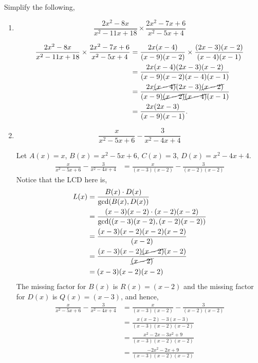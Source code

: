 \documentclass[12pt]{article} %
\begin{document}
\begin{qstn}
  Simplify the following,
  \begin{enumerate}[label=(\alph*)]
    \item \[
        \frac{2x^2 - 8x}{x^2 - 11x + 18} \times \frac{2x^{2} - 7x + 6}{x^2 - 5x + 4}
    \] 

    \begin{solution}
      \begin{align*}
        \frac{2x^2 - 8x}{x^2 - 11x + 18} \times \frac{2x^{2} - 7x + 6}{x^2 - 5x + 4}
        &= \frac{2x(x - 4)}{(x-9)(x-2)} \times \frac{(2x - 3)(x - 2)}{(x-4)(x-1)}\\
        &= \frac{2x(x - 4)(2x - 3)(x - 2)}{(x-9)(x-2)(x-4)(x-1)}\\
        &= \frac{2x\cancel{(x - 4)}(2x - 3)\cancel{(x - 2)}}{(x-9)\cancel{(x-2)}\cancel{(x-4)}(x-1)}\\
        &= \frac{2x(2x - 3)}{(x-9)(x-1)}
      .\end{align*}
      
    \end{solution}

    \newpage

  \item \[
      \frac{x}{x^2 - 5x + 6} - \frac{3}{x^2 - 4x + 4}
  \] 
  \begin{solution}
    Let $A(x) = x$,  $B(x) = x^2 - 5x + 6$, $C(x) = 3$,  $D(x) = x^2 - 4x + 4$.
    \begin{align*}
      \frac{x}{x^2 - 5x + 6} - \frac{3}{x^2 - 4x + 4}
      &= \frac{x}{(x-3)(x-2)} - \frac{3}{(x-2)(x-2)}
    \end{align*}
    Notice that the LCD here is,
    \begin{align*}
      L(x) &= \frac{B(x)\cdot D(x)}{\gcd \left( B(x),D(x) \right) }\\
            &= \frac{(x-3)(x-2)\cdot (x-2)(x-2)}{\gcd \left((x-3)(x-2), (x-2)(x-2) \right) }\\
            &= \frac{(x-3)(x-2) (x-2)(x-2)}{(x-2)}\\
            &= \frac{(x-3)(x-2) \cancel{(x-2)}(x-2)}{\cancel{(x-2)}}\\
            &=(x-3)(x-2)(x-2)
    \end{align*}
    The missing factor for $B(x)$ is  $R(x) = (x-2)$ and the missing factor for  $D(x)$ is  $Q(x) = (x - 3)$, and
    hence,
    \begin{align*}
      \frac{x}{x^2 - 5x + 6} - \frac{3}{x^2 - 4x + 4}
      &= \frac{x}{(x-3)(x-2)} - \frac{3}{(x-2)(x-2)}\\
      &= \frac{x(x-2) - 3(x-3)}{(x-3)(x-2)(x-2)}\\
      &= \frac{x^2 - 2x - 3x^2 + 9}{(x-3)(x-2)(x-2)}\\
      &= \frac{-2x^2 - 2x + 9}{(x-3)(x-2)(x-2)}
    \end{align*}
  \end{solution}
  \end{enumerate}

\end{qstn}
\end{document}
